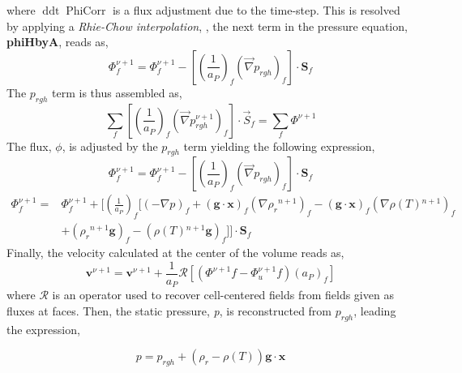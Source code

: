 where $\operatorname{ddt} \operatorname{PhiCorr}$ is a flux adjustment due to the time-step. This is resolved by applying a \textit{Rhie-Chow interpolation}, \cite{rhie_chow_1983}, the next term in the pressure equation, \textbf{phiHbyA}, reads as,
\begin{equation}
\Phi_{f}^{\nu+1}=\Phi_{f}^{\nu+1}-\left[\left(\frac{1}{a_{P}}\right)_{f}\left(\vec{\nabla} p_{r g h}\right)_{f}\right] \cdot \textbf{S}_{f}
\label{3.22}
\end{equation}
The \textbf{$p_{rgh}$} term is thus assembled as,
\begin{equation}
\sum_{f}\left[\left(\frac{1}{a_{P}}\right)_{f}\left(\vec{\nabla} p_{r g h}^{\nu+1}\right)_{f}\right] \cdot \vec{S}_{f}=\sum_{f} \Phi^{\nu+1}
\label{3.23}
\end{equation}
The flux, \textit{$\phi$}, is adjusted by the \textbf{$p_{rgh}$} term yielding the following expression,
\begin{equation}
\Phi_{f}^{\nu+1}=\Phi_{f}^{\nu+1}-\left[\left(\frac{1}{a_{P}}\right)_{f}\left(\vec{\nabla} p_{r g h}\right)_{f}\right] \cdot \textbf{S}_{f}
\label{3.24}
\end{equation}
\begin{equation}
\begin{aligned}
	\Phi_{f}^{\nu+1}=&\Phi_{f}^{\nu+1}+\biggl[\left(\frac{1}{a_{P}}\right)_{f}\biggl[(-\nabla p)_{f}+ (\textbf{g} \cdot \textbf{x})_{f}\left(\nabla \rho_{r}{ }^{n+1}\right)_{f}-(\textbf{g} \cdot \textbf{x})_{f}\left(\nabla \rho(T){ }^{n+1}\right)_{f}\\
	&+ (\rho_{r}{ }^{n+1} \textbf{g})_{f}-(\rho(T){ }^{n+1} \textbf{g})_{f} \biggr]\biggr] \cdot \textbf{S}_{f}
\end{aligned}
\label{3.25}
\end{equation}
Finally, the velocity calculated at the center of the volume reads as,
\begin{equation}
\textbf{v}^{\nu+1}=\textbf{v}^{\nu+1} +\frac{1}{a_{P}}\mathcal{R}\left[\left(\Phi^{\nu+1} f-\Phi_{u}^{\nu+1} f\right)\left(a_{P}\right)_{f}\right]
\label{3.26}
\end{equation}
where $\mathcal{R}$ is an operator used to recover cell-centered fields from fields given as fluxes at faces.
Then, the static pressure, \textit{p}, is reconstructed from \textit{$p_{rgh}$}, leading the expression,

\begin{equation}
p = p_{r g h} + (\rho_{r}-\rho(T))\textbf{g}\cdot \textbf{x}
\label{3.27}
\end{equation}
 
